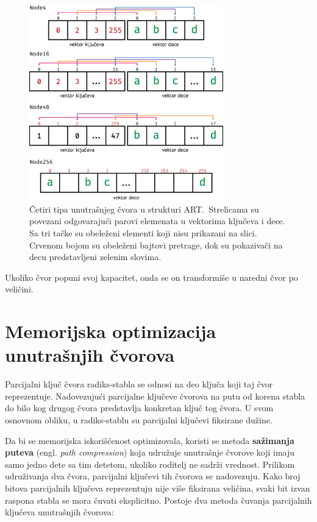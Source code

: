 \documentclass[12pt,oneside]{memoir}
\begin{document}
\begin{figure}[!h]
  \centering
  \includegraphics[width=0.75\textwidth]{radix_nodes.eps}
  \caption{Četiri tipa unutrašnjeg čvora u strukturi ART.\
    Strelicama su povezani
    odgovarajući parovi elemenata u vektorima ključeva i dece. Sa tri tačke
    su obeleženi elementi koji nisu prikazani na slici. Crvenom bojom su obeleženi
    bajtovi pretrage, dok su pokazivači na decu predstavljeni zelenim slovima.
  }
  \label{fig:radix_nodes}
\end{figure}

\noindent Ukoliko čvor popuni svoj kapacitet, onda se on transformiše u naredni
čvor po veličini.

\section{Memorijska optimizacija unutrašnjih čvorova}
Parcijalni ključ čvora radiks-stabla se odnosi na deo ključa
koji taj čvor reprezentuje.
Nadovezujući parcijalne ključeve čvorova na putu od korena stabla
do bilo kog drugog čvora predstavlja konkretan ključ tog čvora.
U svom osnovnom obliku, u radiks-stablu su parcijalni ključevi
fiksirane dužine.

Da bi se memorijska iskorišćenost optimizovala, koristi se metoda
\textbf{sažimanja puteva} (engl. \emph{path compression}) koja udružuje unutrašnje
čvorove koji imaju samo jedno dete sa tim detetom, ukoliko roditelj ne sadrži
vrednost. Prilikom udruživanja dva čvora,
parcijalni ključevi tih čvorova se nadovezuju.
Kako broj bitova parcijalnih ključeva reprezentuju nije više
fiksirana veličina, svaki bit izvan raspona stabla se mora čuvati
eksplicitno. Postoje dva metoda čuvanja parcijalnih ključeva unutrašnjih
čvorova:
\end{document}

